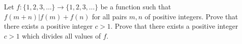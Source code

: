 Let $f: \{1, 2, 3, \dots\} \to \{1, 2, 3, \dots\}$ be a function such that $f(m+n) | f(m) + f(n)$ for all pairs $m, n$ of positive integers. Prove that there exists a positive integer $c>1$. Prove that there exists a positive integer $c > 1$ which divides all values of $f$.